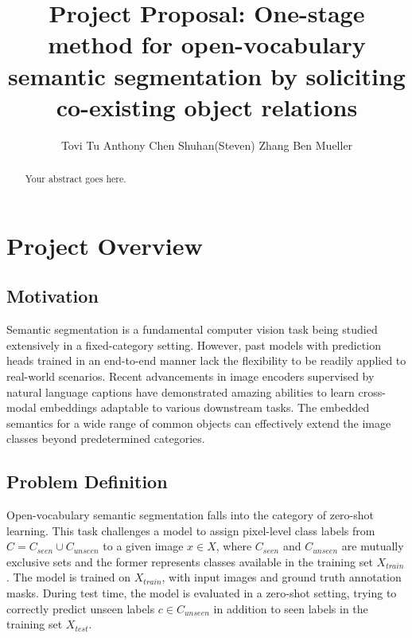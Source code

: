 \documentclass[10pt,twocolumn,letterpaper]{article}
\begin{document}
\title{Project Proposal: One-stage method for open-vocabulary semantic segmentation by soliciting co-existing object relations}

\author{
Tovi Tu \hspace{1in} Anthony Chen \hspace{1in} Shuhan(Steven) Zhang  \hspace{1in} Ben Mueller 
}
\maketitle

\begin{abstract}
  Your abstract goes here.
\end{abstract}

\section{Project Overview}

\subsection{Motivation}

Semantic segmentation is a fundamental computer vision task being studied extensively in a fixed-category setting. However, past models with prediction heads trained in an end-to-end manner lack the flexibility to be readily applied to real-world scenarios. Recent advancements in image encoders supervised by natural language captions have demonstrated amazing abilities to learn cross-modal embeddings adaptable to various downstream tasks. The embedded semantics for a wide range of common objects can effectively extend the image classes beyond predetermined categories. 

\subsection{Problem Definition}

Open-vocabulary semantic segmentation falls into the category of zero-shot learning. This task challenges a model to assign pixel-level class labels from $C=C_{seen} \cup C_{unseen}$ to a given image $x\in X$, where $C_{seen}$ and $C_{unseen}$ are mutually exclusive sets and the former represents classes available in the training set $X_{train}$. The model is trained on $X_{train}$, with input images and ground truth annotation masks. During test time, the model is evaluated in a zero-shot setting, trying to correctly predict unseen labels $c\in C_{unseen}$ in addition to seen labels in the training set $X_{test}$. 
\end{document}
